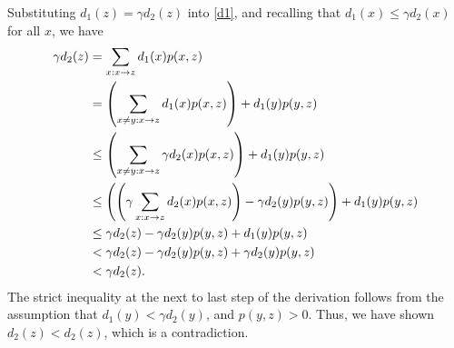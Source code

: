 \documentclass[12pt,twoside]{article}
\begin{document}
\begin{problem}{15}
{  Substituting $d_1(z) = \gamma d_2(z)$ into \eqref{d1}, and recalling
  that $d_1(x) \leq \gamma d_2(x)$ for all $x$, we have
  \begin{align*}
    \gamma d_2(z)
        &= \sum_{x: x\rightarrow z} d_1(x) p(x,z) \\
        &= \left(\sum_{x \neq y: x\rightarrow z}
          d_1(x)p(x,z)\right) + d_1(y) p(y,z) \\
        &\leq \left(\sum_{x \neq y: x\rightarrow z} \gamma d_2(x)
          p(x,z)\right) + d_1(y) p(y,z) \\
        &\leq \left(\left(\gamma \sum_{x: x\rightarrow z} d_2(x)
          p(x,z)\right) - \gamma d_2(y)p(y,z)\right) + d_1(y) p(y,z) \\
        &\leq \gamma d_2(z) - \gamma d_2(y)p(y,z) + d_1(y) p(y,z)\\
        &< \gamma d_2(z) - \gamma d_2(y)p(y,z) + \gamma d_2(y) p(y,z)\\
        &< \gamma d_2(z).
  \end{align*}
  The strict inequality at the next to last step of the derivation
  follows from the assumption that $d_1(y) < \gamma d_2(y)$, and
  $p(y,z) > 0$.  Thus, we have shown $d_2(z) < d_2(z)$, which is a
  contradiction.
}

\eparts
\end{problem}


\end{document}
